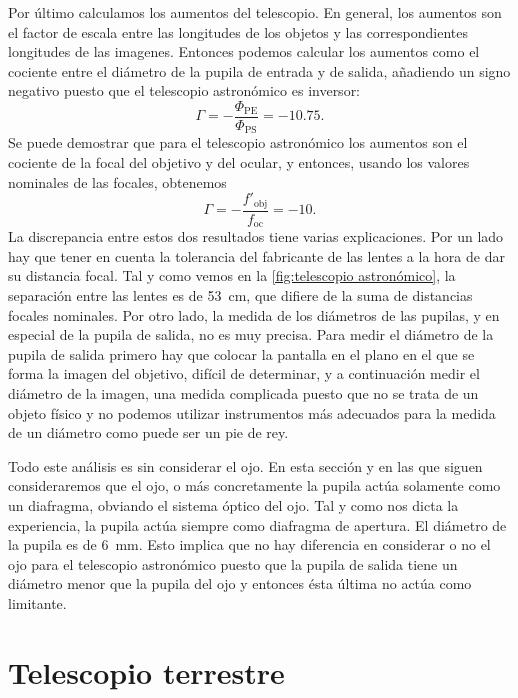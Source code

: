 \documentclass[12pt]{article}
\numberwithin{table}{section}
\numberwithin{figure}{section}
\numberwithin{equation}{section}
\begin{document}
Por último calculamos los aumentos del telescopio. En general, los aumentos son el factor de escala entre las longitudes de los objetos y las correspondientes longitudes de las imagenes. Entonces podemos calcular los aumentos como el cociente entre el diámetro de la pupila de entrada y de salida, añadiendo un signo negativo puesto que el telescopio astronómico es inversor:
\begin{equation} \label{eqn:aumentos astronomico}
	\Gamma = - \frac{\Phi_\text{PE}}{\Phi_\text{PS}} = -\num{10.75}.
\end{equation}
Se puede demostrar que para el telescopio astronómico los aumentos son el cociente de la focal del objetivo y del ocular, y entonces, usando los valores nominales de las focales, obtenemos
\begin{equation} \label{eqn:}
	\Gamma = -\frac{f'_\text{obj}}{f_\text{oc}} = -10.
\end{equation}
La discrepancia entre estos dos resultados tiene varias explicaciones. Por un lado hay que tener en cuenta la tolerancia del fabricante de las lentes a la hora de dar su distancia focal. Tal y como vemos en la \cref{fig:telescopio astronómico}, la separación entre las lentes es de \SI{53}{cm}, que difiere de la suma de distancias focales nominales. Por otro lado, la medida de los diámetros de las pupilas, y en especial de la pupila de salida, no es muy precisa. Para medir el diámetro de la pupila de salida primero hay que colocar la pantalla en el plano en el que se forma la imagen del objetivo, difícil de determinar, y a continuación medir el diámetro de la imagen, una medida complicada puesto que no se trata de un objeto físico y no podemos utilizar instrumentos más adecuados para la medida de un diámetro como puede ser un pie de rey. 

Todo este análisis es sin considerar el ojo. En esta sección y en las que siguen consideraremos que el ojo, o más concretamente la pupila actúa solamente como un diafragma, obviando el sistema óptico del ojo. Tal y como nos dicta la experiencia, la pupila actúa siempre como diafragma de apertura. El diámetro de la pupila es de  \SI{6}{mm}. Esto implica que no hay diferencia en considerar o no el ojo para el telescopio astronómico puesto que la pupila de salida tiene un diámetro menor que la pupila del ojo y entonces ésta última no actúa como limitante.

\section{Telescopio terrestre}
\end{document}
